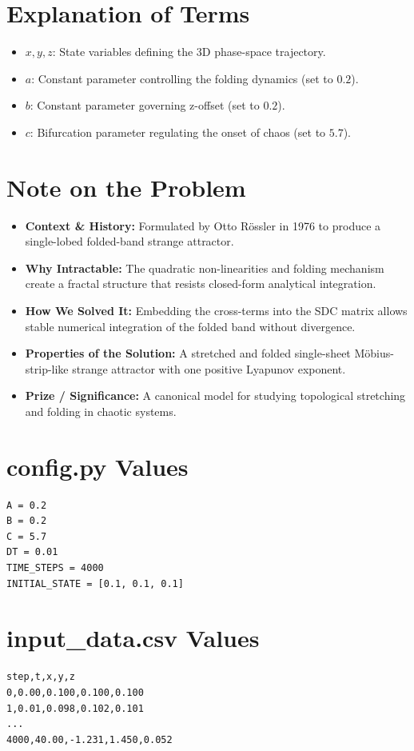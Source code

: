 \section{Explanation of Terms}
\begin{itemize}
    \item $x, y, z$: State variables defining the 3D phase-space trajectory.
    \item $a$: Constant parameter controlling the folding dynamics (set to $0.2$).
    \item $b$: Constant parameter governing z-offset (set to $0.2$).
    \item $c$: Bifurcation parameter regulating the onset of chaos (set to $5.7$).
\end{itemize}

\section{Note on the Problem}
\begin{itemize}
    \item \textbf{Context \& History:} Formulated by Otto R\"ossler in 1976 to produce a single-lobed folded-band strange attractor.
    \item \textbf{Why Intractable:} The quadratic non-linearities and folding mechanism create a fractal structure that resists closed-form analytical integration.
    \item \textbf{How We Solved It:} Embedding the cross-terms into the SDC matrix allows stable numerical integration of the folded band without divergence.
    \item \textbf{Properties of the Solution:} A stretched and folded single-sheet Möbius-strip-like strange attractor with one positive Lyapunov exponent.
    \item \textbf{Prize / Significance:} A canonical model for studying topological stretching and folding in chaotic systems.
\end{itemize}

\section{config.py Values}
\begin{verbatim}
A = 0.2
B = 0.2
C = 5.7
DT = 0.01
TIME_STEPS = 4000
INITIAL_STATE = [0.1, 0.1, 0.1]
\end{verbatim}

\section{input\_data.csv Values}
\begin{verbatim}
step,t,x,y,z
0,0.00,0.100,0.100,0.100
1,0.01,0.098,0.102,0.101
...
4000,40.00,-1.231,1.450,0.052
\end{verbatim}

